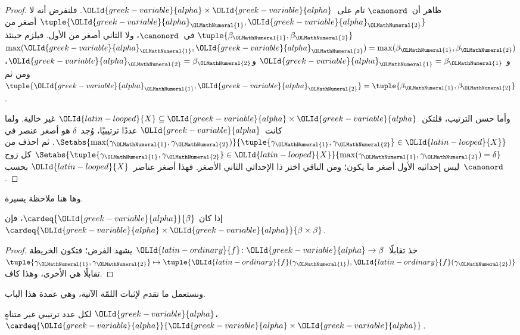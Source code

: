 \documentclass[../../../include/open-logic-section]{subfiles}
\begin{document}
\begin{proof}
ظاهر أن~$\canonord$ تام على~${\OLId{greek-variable}{alpha}} \times {\OLId{greek-variable}{alpha}}$. فلنفرض أنه لا
$\tuple{{\OLId{greek-variable}{alpha}}_{\OLMathNumeral{1}}, {\OLId{greek-variable}{alpha}}_{\OLMathNumeral{2}}}$ أصغر من
$\tuple{\beta_{\OLMathNumeral{1}}, \beta_{\OLMathNumeral{2}}}$ في~$\canonord$، ولا الثاني أصغر من الأول.
فيلزم حينئذ
$\max({\OLId{greek-variable}{alpha}}_{\OLMathNumeral{1}}, {\OLId{greek-variable}{alpha}}_{\OLMathNumeral{2}}) = \max(\beta_{\OLMathNumeral{1}}, \beta_{\OLMathNumeral{2}})$ و
${\OLId{greek-variable}{alpha}}_{\OLMathNumeral{1}} = \beta_{\OLMathNumeral{1}}$ و${\OLId{greek-variable}{alpha}}_{\OLMathNumeral{2}} = \beta_{\OLMathNumeral{2}}$، ومن ثم
$\tuple{{\OLId{greek-variable}{alpha}}_{\OLMathNumeral{1}}, {\OLId{greek-variable}{alpha}}_{\OLMathNumeral{2}}} = \tuple{\beta_{\OLMathNumeral{1}}, \beta_{\OLMathNumeral{2}}}$.

وأما حسن الترتيب، فلتكن~${\OLId{latin-looped}{X}} \subseteq {\OLId{greek-variable}{alpha}}\times{\OLId{greek-variable}{alpha}}$ غير
خالية. ولما كانت~${\OLId{greek-variable}{alpha}}$ عددًا ترتيبيًا، وُجد~$\delta$ هو أصغر عنصر في
$\Setabs{\max(\gamma_{\OLMathNumeral{1}}, \gamma_{\OLMathNumeral{2}})}{\tuple{\gamma_{\OLMathNumeral{1}},
\gamma_{\OLMathNumeral{2}}} \in {\OLId{latin-looped}{X}}}$. ثم احذف من
$\Setabs{\tuple{\gamma_{\OLMathNumeral{1}},\gamma_{\OLMathNumeral{2}}} \in {\OLId{latin-looped}{X}}}{\max(\gamma_{\OLMathNumeral{1}}, \gamma_{\OLMathNumeral{2}}) =
\delta}$ كل زوج ليس إحداثيه الأول أصغر ما يكون؛ ومن الباقي اختر ذا
الإحداثي الثاني الأصغر. فهذا أصغر عناصر~${\OLId{latin-looped}{X}}$ بحسب~$\canonord$.
\end{proof}
\noindent
وها هنا ملاحظة يسيرة.

\begin{prop}
إذا كان $\cardeq{{\OLId{greek-variable}{alpha}}}{\beta}$، فإن
$\cardeq{{\OLId{greek-variable}{alpha}} \times {\OLId{greek-variable}{alpha}}}{\beta \times \beta}$.
\end{prop}

\begin{proof}
خذ تقابلًا~${\OLId{latin-ordinary}{f}} \colon {\OLId{greek-variable}{alpha}} \to \beta$ يشهد الفرض؛
فتكون الخريطة
$\tuple{\gamma_{\OLMathNumeral{1}}, \gamma_{\OLMathNumeral{2}}} \mapsto
\tuple{{\OLId{latin-ordinary}{f}}(\gamma_{\OLMathNumeral{1}}), {\OLId{latin-ordinary}{f}}(\gamma_{\OLMathNumeral{2}})}$ تقابلًا هي الأخرى، وهذا كاف.
\end{proof}
\noindent
ونستعمل ما تقدم لإثبات اللمّة الآتية، وهي عمدة هذا الباب.
\begin{lem}
لكل عدد ترتيبي غير متناهٍ ${\OLId{greek-variable}{alpha}}$،
$\cardeq{{\OLId{greek-variable}{alpha}}}{{\OLId{greek-variable}{alpha}} \times {\OLId{greek-variable}{alpha}}}$.
\end{lem}
\end{document}
